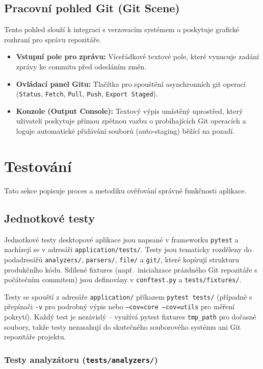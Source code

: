 \documentclass[12pt, a4paper]{article}
\begin{document}
\subsection{Pracovní pohled Git (Git Scene)}
Tento pohled slouží k integraci s verzovacím systémem a poskytuje grafické rozhraní pro správu repozitáře.
\begin{itemize}
    \item \textbf{Vstupní pole pro zprávu:} Víceřádkové textové pole, které vynucuje zadání zprávy ke commitu před odesláním změn.
    \item \textbf{Ovládací panel Gitu:} Tlačítka pro spouštění asynchronních git operací (\texttt{Status}, \texttt{Fetch}, \texttt{Pull}, \texttt{Push}, \texttt{Export Staged}).
    \item \textbf{Konzole (Output Console):} Textový výpis umístěný uprostřed, který uživateli poskytuje přímou zpětnou vazbu o probíhajících Git operacích a loguje automatické přidávání souborů (auto-staging) běžící na pozadí.
\end{itemize}

\section{Testování}

Tato sekce popisuje proces a metodiku ověřování správné funkčnosti aplikace.

\subsection{Jednotkové testy}

Jednotkové testy desktopové aplikace jsou napsané v frameworku \texttt{pytest} a nachízejí se v adresáři
\texttt{application/tests/}. Testy jsou tematicky rozděleny do podadresářů
\texttt{analyzers/}, \texttt{parsers/}, \texttt{file/} a \texttt{git/}, které kopírují
strukturu produkčního kódu. Sdílené fixtures (např.\ inicializace prázdného Git repozitáře
s počátečním commitem) jsou definovány v \texttt{conftest.py} a \texttt{tests/fixtures/}.

Testy se spouští z adresáře \texttt{application/} příkazem \texttt{pytest tests/} (případně
s přepínači \texttt{-v} pro podrobný výpis nebo \texttt{--cov=core --cov=utils} pro měření
pokrytí). Každý test je nezávislý -- využívá pytest fixtures \texttt{tmp\_path}
pro dočasné soubory, takže testy nezasahují do skutečného souborového systému ani Git repozitáře
projektu.

\subsubsection*{Testy analyzátoru (\texttt{tests/analyzers/})}
\end{document}

